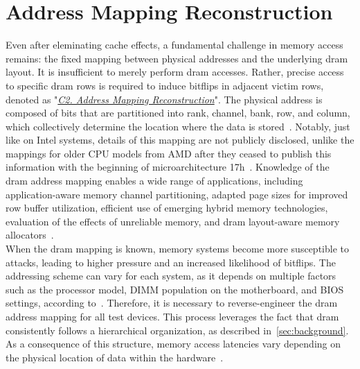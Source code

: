 \section{Address Mapping Reconstruction} \label{sec:targeted}
    Even after eleminating cache effects, a fundamental challenge in memory access remains: the 
    fixed mapping between physical addresses and the underlying \gls{dram} layout. It is insufficient 
    to merely perform \gls{dram} accesses. Rather, precise access to specific \gls{dram} rows is required to
    induce bitflips in adjacent victim rows, denoted as "\textit{\hyperref[ch:targeted]{C2. Address Mapping Reconstruction}}". The physical address is 
    composed of bits that are partitioned into rank, channel, bank, row, and column, which 
    collectively determine the location where the data is stored~\cite{paperReliableReverseEngineering}.
    Notably, just like on Intel systems, details of this mapping are not publicly disclosed, unlike the 
    mappings for older CPU models from AMD after they ceased to publish this information with the beginning 
    of microarchitecture 17h~\cite{webZenCPU, webAMDDeveloperCentral, paperREBankAddressing}.
    Knowledge of the \gls{dram} 
    address mapping enables a wide range of applications, including application-aware memory 
    channel partitioning, adapted page sizes for improved row buffer utilization, efficient use 
    of emerging hybrid memory technologies, evaluation of the effects of unreliable memory, and 
    \gls{dram} layout-aware memory allocators~\cite{paperReliableReverseEngineering}.
    \\
    When the \gls{dram} mapping is known, memory systems become more susceptible to attacks, leading 
    to higher pressure and an increased likelihood of bitflips. The addressing scheme can vary 
    for each system, as it depends on multiple factors such as the processor model, DIMM 
    population on the motherboard, and BIOS settings, according to~\cite{paperReliableReverseEngineering}. Therefore, 
    it is necessary to reverse-engineer the \gls{dram} address mapping for all test devices. This 
    process leverages the fact that \gls{dram} consistently follows a hierarchical organization, as 
    described in~\cref{sec:background}. As a consequence of this 
    structure, memory access latencies vary depending on the physical location of data within 
    the hardware~\cite{thesisDRAMA}.
        
